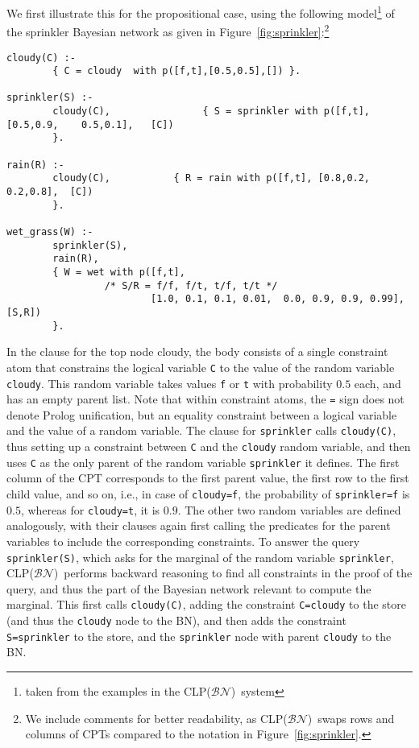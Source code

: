 \documentclass[a4paper]{article}
\newcommand{\clpbn}
  {CLP($\mathcal{BN}$)}
\begin{document}
We first illustrate this for the propositional case, using the
following model\footnote{taken from the examples in the \clpbn\
  system} of the sprinkler Bayesian network as given in
Figure~\ref{fig:sprinkler}:\footnote{We include comments 
for better readability, as \clpbn\ swaps rows and columns of CPTs
  compared to the notation in Figure~\ref{fig:sprinkler}.} 
\begin{verbatim}
cloudy(C) :-
        { C = cloudy  with p([f,t],[0.5,0.5],[]) }.

sprinkler(S) :-
        cloudy(C),                { S = sprinkler with p([f,t], [0.5,0.9,    0.5,0.1],   [C])
        }.

rain(R) :-
        cloudy(C),           { R = rain with p([f,t], [0.8,0.2,   0.2,0.8],  [C])
        }.

wet_grass(W) :-
        sprinkler(S),
        rain(R),
        { W = wet with p([f,t],
                 /* S/R = f/f, f/t, t/f, t/t */
                         [1.0, 0.1, 0.1, 0.01,  0.0, 0.9, 0.9, 0.99], [S,R])
        }.
\end{verbatim}
In the clause for the top node cloudy, the body consists of a single
constraint atom that constrains the
logical variable \verb|C| to the value of the 
random variable \verb|cloudy|. This random variable takes values \verb|f| or \verb|t|
with probability $0.5$ each, and has an empty parent list. Note that
within constraint atoms, the \verb|=| sign does not denote Prolog unification,
but an equality constraint between a logical variable and the value of
a random variable. 
 The clause for
\verb|sprinkler| calls \verb|cloudy(C)|, thus setting up a
constraint between \verb|C| and the \verb|cloudy| random variable, and
then uses \verb|C| as the only parent of the 
random variable \verb|sprinkler| it defines. The first column of the CPT corresponds
to the first parent value, the first row to the first child value, and
so on, i.e., in case of \verb|cloudy=f|, the probability of
\verb|sprinkler=f| is $0.5$, whereas for \verb|cloudy=t|, it is
$0.9$. The other two random variables are defined analogously, with
their clauses again first calling the predicates for the parent
variables to include the corresponding constraints.  To answer the
query \verb|sprinkler(S)|, which asks for the marginal of the random
variable \verb|sprinkler|, \clpbn\ performs backward reasoning to
find all constraints in the proof of the query, and thus the part of
the Bayesian network relevant to compute the marginal. This first
calls \verb|cloudy(C)|, adding the constraint \verb|C=cloudy| to the
store (and thus the \verb|cloudy| node to the BN), and then adds the
constraint \verb|S=sprinkler| to the store, and the \verb|sprinkler|
node with parent \verb|cloudy| to the BN. 
\end{document}
